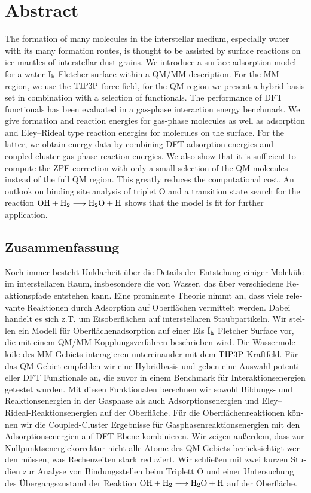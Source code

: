 \section*{Abstract}
      The formation of many molecules in the interstellar medium, especially
      water with its many formation routes, is thought to be assisted by
      surface reactions on ice mantles of interstellar dust grains. We introduce
      a surface adsorption model for a water $\text I_\text h$ Fletcher surface within a QM/MM description.
      For the MM region, we use the $\text{TIP3P}$ force field, for the QM region we
      present a hybrid basis set in combination with a selection of
      functionals. The performance of DFT functionals has been evaluated in a
      gas-phase interaction energy benchmark.
      We give formation and reaction energies for gas-phase molecules
      as well as adsorption and Eley--Rideal type reaction energies for
      molecules on the surface.
      For the latter, we obtain energy data by combining DFT adsorption energies
      and coupled-cluster gas-phase reaction energies. We also show that it is
      sufficient to compute the ZPE correction with only a small selection of
      the QM molecules instead of the full QM region. This greatly reduces the
      computational cost. An outlook on binding site analysis of triplet O and
      a transition state search for the reaction \mbox{$\text O \text H + \text H_2 \longrightarrow \text H _2 \text O
      + \text H$} shows that the model is fit for further application.
\begin{otherlanguage}{ngerman}
\section*{Zusammenfassung}
Noch immer besteht Unklarheit über die Details der Entstehung einiger Moleküle
im interstellaren Raum, insbesondere die von Wasser, das über verschiedene
Reaktionspfade entstehen kann. Eine prominente Theorie nimmt an, dass viele
relevante Reaktionen durch Adsorption auf Oberflächen vermittelt werden. Dabei
handelt es sich z.T. um Eisoberflächen auf interstellaren Staubpartikeln. Wir
stellen ein Modell für Oberflächenadsorption auf einer Eis $\text I_\text h$ Fletcher
Surface vor, die mit einem QM/MM-Kopplungsverfahren beschrieben wird. Die
Wassermoleküle des MM-Gebiets interagieren untereinander mit dem
$\text{TIP3P}$-Kraftfeld. Für das QM-Gebiet empfehlen wir eine Hybridbasis und geben
eine Auswahl potentieller DFT Funktionale an, die zuvor in einem Benchmark für
Interaktionsenergien getestet wurden. Mit diesen Funktionalen berechnen wir
sowohl Bildungs- und Reaktionsenergien in der Gasphase als auch
Adsorptionsenergien und Eley--Rideal-\allowbreak Reaktionsenergien auf der
Oberfläche. Für die Oberflächenreaktionen können wir die Coupled-Cluster
Ergebnisse für Gasphasenreaktionsenergien mit den Adsorptionsenergien auf
DFT-Ebene kombinieren. Wir zeigen außerdem, dass zur Nullpunktsenergiekorrektur
nicht alle Atome des QM-Gebiets berücksichtigt werden müssen, was Rechenzeiten
stark reduziert. Wir schließen mit zwei kurzen Studien zur Analyse von
Bindungsstellen beim Triplett O und einer Untersuchung des Übergangszustand der
Reaktion \mbox{$\text O \text H + \text H_2 \longrightarrow \text H _2 \text O + \text H$} auf der Oberfläche.
\end{otherlanguage}
\cleardoublepage



